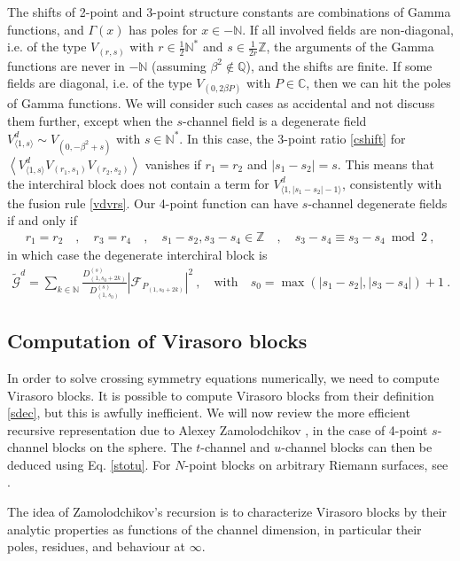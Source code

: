 \documentclass[12pt, a4paper]{article}
\begin{document}
The shifts of 2-point and 3-point structure constants are combinations of Gamma functions, and $\Gamma(x)$ has poles for $x\in -\mathbb{N}$.
If all involved fields are non-diagonal, i.e. of the type $V_{(r,s)}$ with $r\in\frac12\mathbb{N}^*$ and $s\in\frac{1}{2r}\mathbb{Z}$, the arguments of the Gamma functions are never in $-\mathbb{N}$ (assuming $\beta^2\notin \mathbb{Q}$), and the shifts are finite. If some fields are diagonal, i.e. of the type $V_{(0,2\beta P)}$ with $P\in \mathbb{C}$, then we can hit the poles of Gamma functions. We will consider such cases as accidental and not discuss them further, except when the $s$-channel field is a degenerate field $V^d_{\langle 1,s\rangle}\sim V_{(0,-\beta^2+s)}$ with $s\in\mathbb{N}^*$. 
In this case, the 3-point ratio \eqref{cshift} for $\left<V^d_{\langle 1,s\rangle}V_{(r_1,s_1)}V_{(r_2,s_2)}\right>$ vanishes if $r_1=r_2$ and $|s_1-s_2|=s$. This means that the interchiral block does not contain a term for $V^d_{\langle 1,|s_1-s_2|-1\rangle}$, consistently with the fusion rule \eqref{vdvrs}. Our 4-point function can have $s$-channel degenerate fields if and only if 
\begin{align}
 r_1=r_2 \quad , \quad r_3=r_4 \quad , \quad s_1-s_2,s_3-s_4\in \mathbb{Z} \quad , \quad s_3-s_4\equiv s_3-s_4\bmod 2\ , 
\end{align}
in which case the degenerate interchiral block is 
\begin{align}
 \boxed{\widetilde{\mathcal{G}}^d = \sum_{k\in \mathbb{N}} \frac{D^{(s)}_{(1,s_0+2k)}}{D^{(s)}_{(1,s_0)}}\left| \mathcal{F}_{P_{(1,s_0+2k)}} \right|^2\ ,  \quad \text{with} \quad s_0 =  \max(|s_1-s_2|,|s_3-s_4|)+1}\ . 
\end{align}

\subsection{Computation of Virasoro blocks}

In order to solve crossing symmetry equations numerically, we need to compute Virasoro blocks. It is possible to compute Virasoro blocks from their definition \eqref{sdec}, but this is awfully inefficient. We will now review the more efficient recursive representation due to Alexey Zamolodchikov \cite{zam87b}, in the case of 4-point $s$-channel blocks on the sphere. The $t$-channel and $u$-channel blocks can then be deduced using Eq. \eqref{stotu}. For $N$-point blocks on arbitrary Riemann surfaces, see \cite{ccy17}.

The idea of Zamolodchikov's recursion is to characterize Virasoro blocks by their analytic properties as functions of the channel dimension, in particular their poles, residues, and behaviour at $\infty$. 
\end{document}
